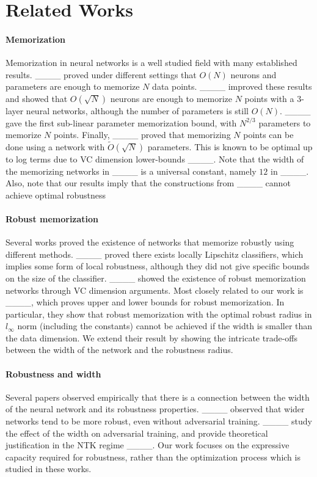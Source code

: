 \section{Related Works}
\label{sec:related}

\paragraph{Memorization}

Memorization in neural networks is a well studied field with many established results. ____ proved under different settings that $O(N)$ neurons and parameters are enough to memorize $N$ data points. ____ improved these results and showed that $O(\sqrt{N})$ neurons are enough to memorize $N$ points with a $3$-layer neural networks, although the number of parameters is still $O(N)$.  ____ gave the first sub-linear parameter memorization bound, with $N^{2/3}$ parameters to memorize $N$ points. Finally, ____ proved that memorizing $N$ points can be done using a network with $\tilde{O}(\sqrt{N})$ parameters. This is known to be optimal up to log terms due to VC dimension lower-bounds ____. Note that the width of the memorizing networks in ____ is a universal constant, namely $12$ in ____. Also, note that our results imply that the constructions from ____ cannot achieve optimal robustness

\paragraph{Robust memorization}

Several works proved the existence of networks that memorize robustly using different methods. ____ proved there exists locally Lipschitz classifiers, which implies some form of local robustness, although they did not give specific bounds on the size of the classifier. ____ showed the existence of robust memorization networks through VC dimension arguments. Most closely related to our work is ____, which proves upper and lower bounds for robust memorization. In particular, they show that robust memorization with the optimal robust radius in $l_\infty$ norm (including the constants) cannot be achieved  if the width is smaller than the data dimension. We extend their result by showing the intricate trade-offs between the width of the network and the robustness radius. 

\paragraph{Robustness and width}
Several papers observed empirically that there is a connection between the width of the neural network and its robustness properties. ____ observed that wider networks tend to be more robust, even without adversarial training. ____ study the effect of the width on adversarial training, and provide theoretical justification in the NTK regime ____. Our work focuses on the expressive capacity required for robustness, rather than the optimization process which is studied in these works.